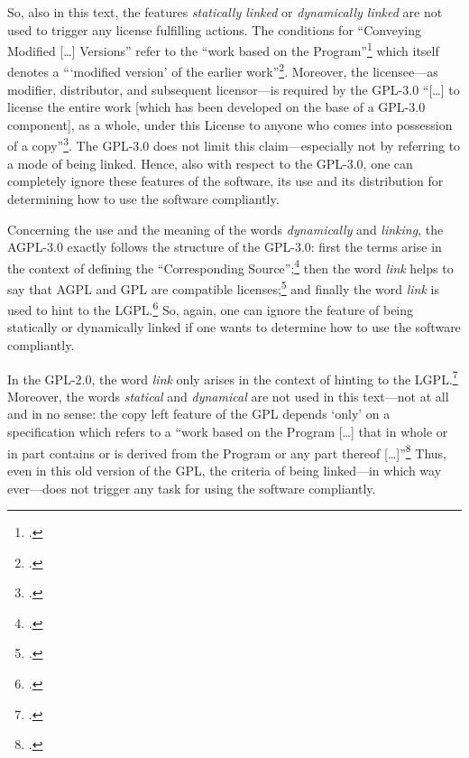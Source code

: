 \begin{description}
  So, also in this text, the features \emph{statically linked} or
  \emph{dynamically linked} are not used to trigger any license fulfilling
  actions. The conditions for \enquote{Conveying Modified [\ldots] Versions}
  refer to the \enquote{work based on the Program}\footcite[cf.][\nopage wp.\
  §5]{Gpl30OsiLicense2007a} which itself denotes a \enquote{\enquote{modified
  version} of the earlier work}\footcite[cf.][\nopage wp.\
  §0]{Gpl30OsiLicense2007a}. Moreover, the licensee---as modifier, distributor,
  and subsequent licensor---is required by the GPL-3.0 \enquote{[\ldots] to
  license the entire work [which has been developed on the base of a GPL-3.0
  component], as a whole, under this License to anyone who comes into possession
  of a copy}\footcite[cf.][\nopage wp.\ §5]{Gpl30OsiLicense2007a}. The GPL-3.0
  does not limit this claim---especially not by referring to a mode of being
  linked. Hence, also with respect to the GPL-3.0, one can completely ignore
  these features of the software, its use and its distribution for determining
  how to use the software compliantly.

  \item[AGPL-3.0:] Concerning the use and the meaning of the words
  \emph{dynamically} and \emph{linking}, the AGPL-3.0 exactly follows the
  structure of the GPL-3.0: first the terms arise in the context of defining the
  \enquote{Corresponding Source};\footcite[cf.][\nopage wp.\
  §0]{Agpl30OsiLicense2007a} then the word \emph{link} helps to say that AGPL
  and GPL are compatible licenses;\footcite[cf.][\nopage wp.\
  §13]{Agpl30OsiLicense2007a} and finally the word \emph{link} is used to hint
  to the LGPL.\footcite[cf.][\nopage wp.\ §5]{Agpl30OsiLicense2007a} So, again,
  one can ignore the feature of being statically or dynamically linked if one
  wants to determine how to use the software compliantly.

  \item[GPL-2.0:] In the GPL-2.0, the word \emph{link} only arises in the context
  of hinting to the LGPL.\footcite [cf.][\nopage wp.\ last
  paragraph]{Gpl20OsiLicense1991a} Moreover, the words \emph{statical} and
  \emph{dynamical} are not used in this text---not at all and in no sense: the
  copy left feature of the GPL depends `only' on a specification which refers to
  a \enquote{work based on the Program [\ldots] that in whole or in part
  contains or is derived from the Program or any part thereof [\ldots]}\footcite
  [cf.][\nopage wp.\ §2]{Gpl20OsiLicense1991a} Thus, even in this old version
  of the GPL, the criteria of being linked---in which way ever---does not
  trigger any task for using the software compliantly.


\end{description}
